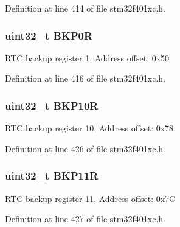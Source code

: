 Definition at line 414 of file stm32f401xc.\+h.

\subsubsection[{\texorpdfstring{B\+K\+P0R}{BKP0R}}]{ uint32\+\_\+t B\+K\+P0R}\hypertarget{struct_r_t_c___type_def_a4808ec597e5a5fefd8a83a9127dd1aec}{}\label{struct_r_t_c___type_def_a4808ec597e5a5fefd8a83a9127dd1aec}
R\+TC backup register 1, Address offset\+: 0x50 

Definition at line 416 of file stm32f401xc.\+h.

\subsubsection[{\texorpdfstring{B\+K\+P10R}{BKP10R}}]{ uint32\+\_\+t B\+K\+P10R}\hypertarget{struct_r_t_c___type_def_aade2881a3e408bfd106b27f78bbbcfc9}{}\label{struct_r_t_c___type_def_aade2881a3e408bfd106b27f78bbbcfc9}
R\+TC backup register 10, Address offset\+: 0x78 

Definition at line 426 of file stm32f401xc.\+h.

\subsubsection[{\texorpdfstring{B\+K\+P11R}{BKP11R}}]{ uint32\+\_\+t B\+K\+P11R}\hypertarget{struct_r_t_c___type_def_ac66d5e2d3459cff89794c47dbc8f7228}{}\label{struct_r_t_c___type_def_ac66d5e2d3459cff89794c47dbc8f7228}
R\+TC backup register 11, Address offset\+: 0x7C 

Definition at line 427 of file stm32f401xc.\+h.

